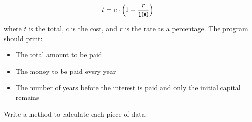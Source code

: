 \documentclass{article}
\begin{document}
$$t = c \cdot \left(1+ {r \over 100}\right)$$

where $t$ is the total, $c$ is the cost,
and $r$ is the rate as a percentage. The program should print: 

\begin{itemize}
\item The total amount to be paid
\item The money to be paid every year
\item The number of years before the interest is paid and only the
  initial capital remains
\end{itemize}

Write a method to calculate each piece of data. 

%






\end{document}

